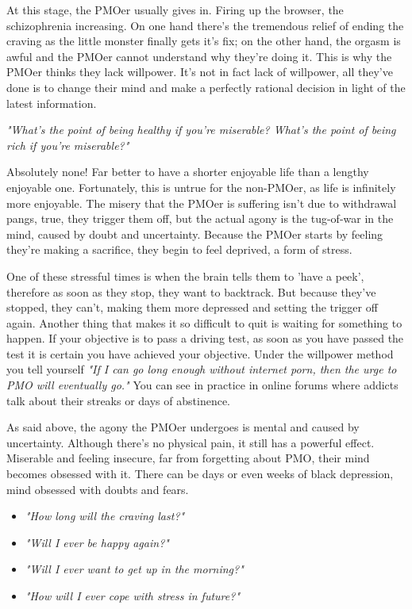 \documentclass[easypeasy.tex]{subfiles}
\begin{document}
At this stage, the PMOer usually gives in. Firing up the browser, the schizophrenia increasing. On one hand there's the tremendous relief of ending the craving as the little monster finally gets it's fix; on the other hand, the orgasm is awful and the PMOer cannot understand why they're doing it. This is why the PMOer thinks they lack willpower. It's not in fact lack of willpower, all they've done is to change their mind and make a perfectly rational decision in light of the latest information.
  
  \textit{"What's the point of being healthy if you're miserable? What's the point of being rich if you're miserable?"}

Absolutely none! Far better to have a shorter enjoyable life than a lengthy enjoyable one. Fortunately, this is untrue for the non-PMOer, as life is infinitely more enjoyable. The misery that the PMOer is suffering isn't due to withdrawal pangs, true, they trigger them off, but the actual agony is the tug-of-war in the mind, caused by doubt and uncertainty. Because the PMOer starts by feeling they're making a sacrifice, they begin to feel deprived, a form of stress.

One of these stressful times is when the brain tells them to 'have a peek', therefore as soon as they stop, they want to backtrack. But because they've stopped, they can't, making them more depressed and setting the trigger off again. Another thing that makes it so difficult to quit is waiting for something to happen. If your objective is to pass a driving test, as soon as you have passed the test it is certain you have achieved your objective. Under the willpower method you tell yourself \textit{"If I can go long enough without internet porn, then the urge to PMO will eventually go."} You can see in practice in online forums where addicts talk about their streaks or days of abstinence.

As said above, the agony the PMOer undergoes is mental and caused by uncertainty. Although there's no physical pain, it still has a powerful effect. Miserable and feeling insecure, far from forgetting about PMO, their mind becomes obsessed with it. There can be days or even weeks of black depression, mind obsessed with doubts and fears.

\begin{itemize}
  \item \textit{"How long will the craving last?"}
  \item \textit{"Will I ever be happy again?"}
  \item \textit{"Will I ever want to get up in the morning?"}
  \item \textit{"How will I ever cope with stress in future?"}
\end{itemize}
\end{document}
